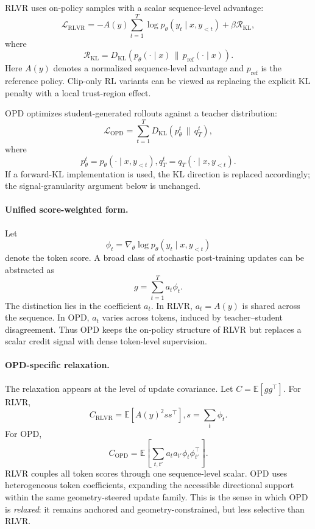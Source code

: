 RLVR uses on-policy samples with a scalar sequence-level advantage:
\begin{equation}
\mathcal{L}_{\mathrm{RLVR}}
=
-
A(y)
\sum_{t=1}^{T}
\log p_\theta(y_t\mid x,y_{<t})
+
\beta \mathcal{R}_{\mathrm{KL}},
\end{equation}
where
\begin{equation}
\mathcal{R}_{\mathrm{KL}}
=
D_{\mathrm{KL}}
\!\left(
p_\theta(\cdot\mid x)
\,\|\,
p_{\mathrm{ref}}(\cdot\mid x)
\right).
\end{equation}
Here $A(y)$ denotes a normalized sequence-level advantage and
$p_{\mathrm{ref}}$ is the reference policy. Clip-only RL variants can be
viewed as replacing the explicit KL penalty with a local trust-region effect.

OPD optimizes student-generated rollouts against a teacher distribution:
\begin{equation}
\mathcal{L}_{\mathrm{OPD}}
=
\sum_{t=1}^{T}
D_{\mathrm{KL}}
\!\left(
p_\theta^t
\,\|\,
q_T^t
\right),
\end{equation}
where
\[
p_\theta^t
=
p_\theta(\cdot\mid x,y_{<t}),
q_T^t
=
q_T(\cdot\mid x,y_{<t}).
\]
If a forward-KL implementation is used, the KL direction is replaced
accordingly; the signal-granularity argument below is unchanged.

\paragraph{Unified score-weighted form.}
Let
\begin{equation}
\phi_t
=
\nabla_\theta
\log p_\theta(y_t\mid x,y_{<t})
\end{equation}
denote the token score. A broad class of stochastic post-training updates can
be abstracted as
\begin{equation}
g
=
\sum_{t=1}^{T}
a_t \phi_t .
\label{eq:app_unified_gradient}
\end{equation}
The distinction lies in the coefficient $a_t$. In RLVR, $a_t=A(y)$ is shared
across the sequence. In OPD, $a_t$ varies across tokens, induced by
teacher--student disagreement. Thus OPD keeps the on-policy structure of RLVR
but replaces a scalar credit signal with dense token-level supervision.

\paragraph{OPD-specific relaxation.}
The relaxation appears at the level of update covariance. Let
$C=\mathbb{E}[gg^\top]$. For RLVR,
\begin{equation}
C_{\mathrm{RLVR}}
=
\mathbb{E}
\left[
A(y)^2 ss^\top
\right],
s=\sum_t \phi_t .
\end{equation}
For OPD,
\begin{equation}
C_{\mathrm{OPD}}
=
\mathbb{E}
\left[
\sum_{t,t'}
a_t a_{t'}
\phi_t \phi_{t'}^\top
\right].
\end{equation}
RLVR couples all token scores through one sequence-level scalar. OPD uses
heterogeneous token coefficients, expanding the accessible directional support
within the same geometry-steered update family. This is the sense in which OPD
is \emph{relaxed}: it remains anchored and geometry-constrained, but less
selective than RLVR.

